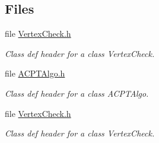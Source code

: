 \subsection*{\-Files}
\begin{DoxyCompactItemize}
\item 
file \hyperlink{VertexCheck_8h}{\-Vertex\-Check.\-h}
\begin{DoxyCompactList}\small\item\em \-Class def header for a class \-Vertex\-Check. \end{DoxyCompactList}\item 
file \hyperlink{ACPTAlgo_8h}{\-A\-C\-P\-T\-Algo.\-h}
\begin{DoxyCompactList}\small\item\em \-Class def header for a class \-A\-C\-P\-T\-Algo. \end{DoxyCompactList}\item 
file \hyperlink{VertexCheck_8h}{\-Vertex\-Check.\-h}
\begin{DoxyCompactList}\small\item\em \-Class def header for a class \-Vertex\-Check. \end{DoxyCompactList}\end{DoxyCompactItemize}

